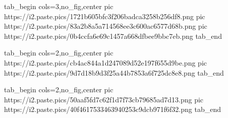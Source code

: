  
 
 
 
 
\zzSecCmtScr

\ifcmt
  tab_begin cols=3,no_fig,center
     pic https://i2.paste.pics/1721b605bfc3f206badca3258b256df8.png
		 pic https://i2.paste.pics/83a2b8a5a714568ee3c600ac6577d68b.png
		 pic https://i2.paste.pics/0b4ccfa6e69c1457a668dfbee9bbc7eb.png
  tab_end
\fi

\ifcmt
  tab_begin cols=2,no_fig,center
		pic https://i2.paste.pics/cb4ac844a1d247089d52e197f655d9be.png
		pic https://i2.paste.pics/9d7d18b9d3f25a44b7853a6f725dc8e8.png
  tab_end
\fi

\ifcmt
  tab_begin cols=2,no_fig,center
		pic https://i2.paste.pics/50aaf5fd7c62f1d7f73cb79685ad7d13.png
		pic https://i2.paste.pics/40f4617533463940253c9dcb971f6f32.png
  tab_end
\fi
